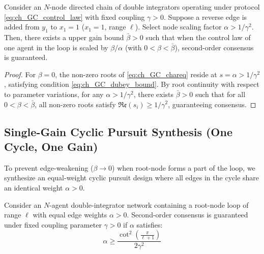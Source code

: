 \begin{theo}\label{theo3ES}
\leavevmode\par\noindent
Consider an $N$-node directed chain of double integrators operating under protocol \eqref{eq:ch_GC_control_law} with fixed coupling $\gamma > 0$. Suppose a reverse edge is added from $y_1$ to $x_1 = 1$ ($x_1 = 1$, range $\ell$). Select node scaling factor $\alpha > 1/\gamma^2$. Then, there exists a upper gain bound $\bar{\beta} > 0$ such that when the control law of one agent in the loop is scaled by $\beta / \alpha$ (with $0 < \beta < \bar{\beta}$), second-order consensus is guaranteed.
\end{theo}

\begin{proof}
For $\beta = 0$, the non-zero roots of \eqref{eq:ch_GC_chareq} reside at $s = \alpha > 1/\gamma^2$, satisfying condition \eqref{eq:ch_GC_dubey_bound}. By root continuity with respect to parameter variations, for any $\alpha > 1/\gamma^2$, there exists $\bar{\beta} > 0$ such that for all $0 < \beta < \bar{\beta}$, all non-zero roots satisfy $\mathfrak{Re}(s_i) \ge 1/\gamma^2$, guaranteeing consensus.
\end{proof}

\subsection{Single-Gain Cyclic Pursuit Synthesis (One Cycle, One Gain)}

To prevent edge-weakening ($\beta \to 0$) when root-node forms a part of the loop, we synthesize an equal-weight cyclic pursuit design where all edges in the cycle share an identical weight $\alpha > 0$.

\begin{theo}\label{theoonegain}
\leavevmode\par\noindent
Consider an $N$-agent double-integrator network containing a root-node loop of range $\ell$ with equal edge weights $\alpha > 0$. Second-order consensus is guaranteed under fixed coupling parameter $\gamma > 0$ if $\alpha$ satisfies:
\begin{equation}\label{eq:ch_GC_onegain_bound}
	\alpha \ge \frac{\cot^2\left(\frac{\pi}{\ell+1}\right)}{2\gamma^2}
\end{equation}
\end{theo}

